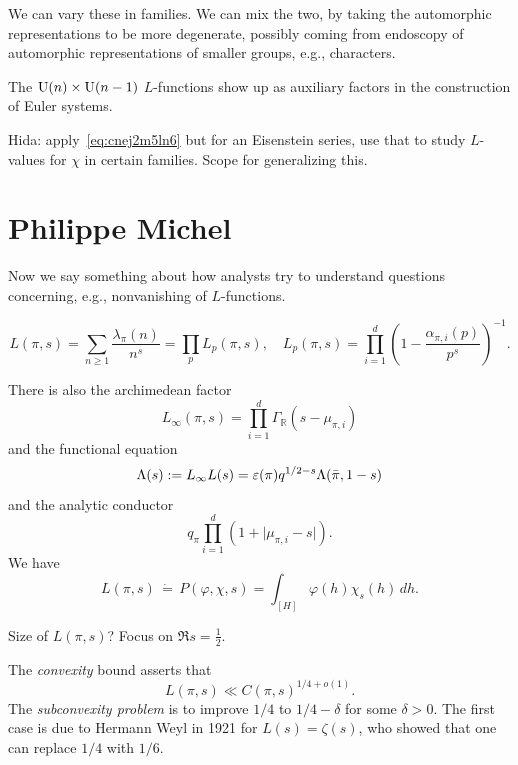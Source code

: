 \documentclass[reqno]{amsart} 
\begin{document}
We can vary these in families.  We can mix the two, by taking the automorphic representations to be more degenerate, possibly coming from endoscopy of automorphic representations of smaller groups, e.g., characters.

The $\operatorname{U}(n) \times \operatorname{U}(n-1)$ $L$-functions show up as auxiliary factors in the construction of Euler systems.

Hida: apply~\eqref{eq:cnej2m5ln6} but for an Eisenstein series, use that to study $L$-values for $\chi$ in certain families.  Scope for generalizing this.


\section{Philippe Michel}
Now we say something about how analysts try to understand questions concerning, e.g., nonvanishing of $L$-functions.

\begin{equation*}
  L(\pi, s ) = \sum_{n \geq 1} \frac{\lambda_\pi(n)}{ n^s }
  = \prod_p L_p(\pi, s ),
  \quad
  L_p(\pi, s ) = \prod_{i = 1 }^d
  \left( 1 - \frac{\alpha_{\pi, i}(p)}{ p^s } \right)^{-1}.
\end{equation*}

There is also the archimedean factor
\begin{equation*}
  L _\infty(\pi, s) = \prod_{i = 1 }^d \Gamma_{\mathbb{R} } (s - \mu_{\pi, i })
\end{equation*}
and the functional equation
\begin{equation*}
  \Lambda(s) := L _\infty L(s) = \varepsilon(\pi) q^{1/2 - s} \Lambda(\bar{\pi}, 1 - s)
\end{equation*}
and the analytic conductor
\begin{equation*}
  q_\pi \prod_{i = 1 }^d \left( 1 + \lvert \mu_{\pi, i } - s \rvert \right).
\end{equation*}
We have
\begin{equation*}
  L(\pi, s ) \, \dot{=} \,
  P(\varphi, \chi, s)
  = \int_{[H]}
  \varphi(h) \chi_s(h) \, d h.
\end{equation*}

Size of $L(\pi, s)$?  Focus on $\Re s = \tfrac{1}{2}$.

The \emph{convexity} bound asserts that
\begin{equation*}
  L(\pi, s) \ll C(\pi, s )^{1/4 + o (1)}.
\end{equation*}
The \emph{subconvexity problem} is to improve $1/4$ to $1 /4 - \delta $ for some $\delta > 0$.  The first case is due to Hermann Weyl in 1921 for $L(s) = \zeta(s)$, who showed that one can replace $1/4$ with $1/6$.
\end{document}
